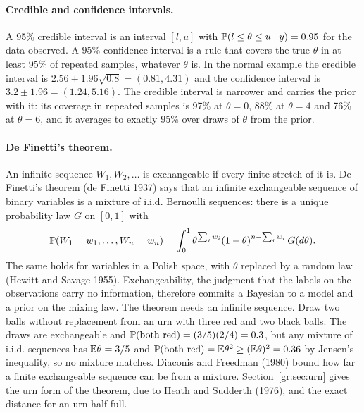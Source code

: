 \paragraph{Credible and confidence intervals.} A 95\% credible interval is an interval $[l, u]$ with $\mathbb{P}(l \le \theta \le u \mid y) = 0.95$ for the data observed. A 95\% confidence interval is a rule that covers the true $\theta$ in at least 95\% of repeated samples, whatever $\theta$ is. In the normal example the credible interval is $2.56 \pm 1.96\sqrt{0.8} = (0.81, 4.31)$ and the confidence interval is $3.2 \pm 1.96 = (1.24, 5.16)$. The credible interval is narrower and carries the prior with it: its coverage in repeated samples is 97\% at $\theta = 0$, 88\% at $\theta = 4$ and 76\% at $\theta = 6$, and it averages to exactly 95\% over draws of $\theta$ from the prior.

\paragraph{De Finetti's theorem.} An infinite sequence $W_1, W_2, \dots$ is exchangeable if every finite stretch of it is. De Finetti's theorem (de Finetti 1937) says that an infinite exchangeable sequence of binary variables is a mixture of i.i.d. Bernoulli sequences: there is a unique probability law $G$ on $[0, 1]$ with
\[
\mathbb{P}(W_1 = w_1, \dots, W_n = w_n) = \int_0^1 \theta^{\sum_i w_i}(1 - \theta)^{n - \sum_i w_i}\,G(d\theta).
\]
The same holds for variables in a Polish space, with $\theta$ replaced by a random law (Hewitt and Savage 1955). Exchangeability, the judgment that the labels on the observations carry no information, therefore commits a Bayesian to a model and a prior on the mixing law. The theorem needs an infinite sequence. Draw two balls without replacement from an urn with three red and two black balls. The draws are exchangeable and $\mathbb{P}(\text{both red}) = (3/5)(2/4) = 0.3$, but any mixture of i.i.d. sequences has $\mathbb{E}\theta = 3/5$ and $\mathbb{P}(\text{both red}) = \mathbb{E}\theta^2 \ge (\mathbb{E}\theta)^2 = 0.36$ by Jensen's inequality, so no mixture matches. Diaconis and Freedman (1980) bound how far a finite exchangeable sequence can be from a mixture. Section~\ref{gr:sec:urn} gives the urn form of the theorem, due to Heath and Sudderth (1976), and the exact distance for an urn half full.

